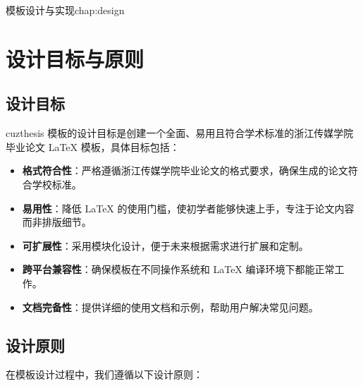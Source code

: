 \begin{cuzchapter}{模板设计与实现}{chap:design}


    \section{设计目标与原则}\label{sec:design-goals}

    \subsection{设计目标}

    cuzthesis 模板的设计目标是创建一个全面、易用且符合学术标准的浙江传媒学院毕业论文 \LaTeX{} 模板，具体目标包括：

    \begin{itemize}
        \item \textbf{格式符合性}：严格遵循浙江传媒学院毕业论文的格式要求，确保生成的论文符合学校标准。

        \item \textbf{易用性}：降低 \LaTeX{} 的使用门槛，使初学者能够快速上手，专注于论文内容而非排版细节。

        \item \textbf{可扩展性}：采用模块化设计，便于未来根据需求进行扩展和定制。

        \item \textbf{跨平台兼容性}：确保模板在不同操作系统和 \LaTeX{} 编译环境下都能正常工作。

        \item \textbf{文档完备性}：提供详细的使用文档和示例，帮助用户解决常见问题。
    \end{itemize}

    \subsection{设计原则}

    在模板设计过程中，我们遵循以下设计原则：


\end{cuzchapter}
